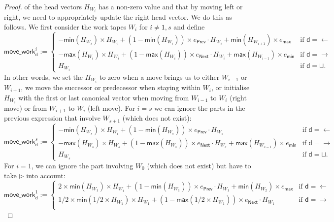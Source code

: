 \begin{proof}
    of the head vectors $H_{W_i}$ has a non-zero value and that by moving left or right, we need to 
    appropriately update the right head vector. We do this as follows. We first consider the work tapes 
    $W_i$ for $i\neq 1,s$ and define
    $$
    \mathsf{move\_work}^i_{\mathsf{d}}:=
    \begin{cases}
        -\mathsf{min}(H_{W_i})\times H_{W_i} + (1-\mathsf{min}(H_{W_i}))\times e_{\mathsf{Prev}}\cdot H_{W_i} + \mathsf{min}(H_{W_{i+1}})\times e_{\mathsf{max}} & \text{if $\mathsf{d}=\leftarrow$}\\
            -\mathsf{max}(H_{W_i})\times H_{W_i} + (1-\mathsf{max}(H_{W_i}))\times e_{\mathsf{Next}}\cdot H_{W_i} + \mathsf{max}(H_{W_{i-1}})\times e_{\mathsf{min}} & \text{if $\mathsf{d}=\rightarrow$}\\
        H_{W_i} & \text{if $\mathsf{d}=\sqcup$}. 	
    \end{cases}
    $$
    In other words, we set the $H_{W_i}$ to zero when a move brings us to either $W_{i-1}$ or $W_{i+1}$, we
    move the successor or predecessor when staying within $W_i$, or initialise $H_{W_i}$ with the first or 
    last canonical vector when moving from $W_{i-1}$ to $W_i$ (right move) or from $W_{i+1}$ to $W_i$ (left move).
    For $i=s$ we can ignore the parts in the previous expression that involve $W_{s+1}$ (which does not exist):
    $$
    \mathsf{move\_work}^s_{\mathsf{d}}:=
    \begin{cases}
        -\mathsf{min}(H_{W_s})\times H_{W_i} + (1-\mathsf{min}(H_{W_s}))\times e_{\mathsf{Prev}}\cdot H_{W_s}  & \text{if $\mathsf{d}=\leftarrow$}\\
            -\mathsf{max}(H_{W_s}) \times H_{W_s} + (1-\mathsf{max}(H_{W_s}))\times e_{\mathsf{Next}}\cdot H_{W_s} + \mathsf{max}(H_{W_{s-1}})\times e_{\mathsf{min}} & \text{if $\mathsf{d}=\rightarrow$}\\
        H_{W_s} & \text{if $\mathsf{d}=\sqcup$}. 	
    \end{cases}
    $$
    For $i=1$, we can ignore the part involving $W_{0}$ (which does not exist) but have to take $\rhd$ 
    into account:
    $$
    \mathsf{move\_work}^1_{\mathsf{d}}:=
    \begin{cases}
        2\times \mathsf{min}(H_{W_1})\times H_{W_i} + (1-\mathsf{min}(H_{W_1}))\times e_{\mathsf{Prev}}\cdot H_{W_1} + \mathsf{min}(H_{W_{2}})\times e_{\mathsf{max}} & \text{if $\mathsf{d}=\leftarrow$}\\
            1/2\times\mathsf{min}(1/2\times H_{W_1})\times H_{W_1} + (1-\mathsf{max}(1/2\times H_{W_1}))\times e_{\mathsf{Next}}\cdot H_{W_1}  & \text{if $\mathsf{d}=\rightarrow$}\\

\end{cases}$$
\end{proof}
